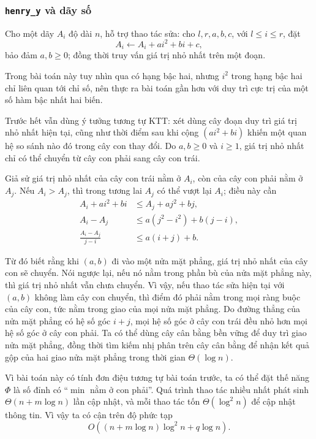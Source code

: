 \documentclass[11pt]{article}
\begin{document}
\subsubsection{\texttt{henry\_y} và dãy số}

 Cho một dãy \(A_i\) độ dài \(n\), hỗ trợ thao tác sửa:
cho \(l,r,a,b,c\), với \(l\le i\le r\), đặt
\[
  A_i\gets A_i+ai^2+bi+c,
\]
bảo đảm \(a,b\ge 0\); đồng thời truy vấn giá trị nhỏ nhất trên một đoạn.

 Trong bài toán này tuy nhìn qua có hạng bậc hai, nhưng
\(i^2\) trong hạng bậc hai chỉ liên quan tới chỉ số, nên thực ra bài toán gần
hơn với duy trì cực trị của một số hàm bậc nhất hai biến.

Trước hết vẫn dùng ý tưởng tương tự KTT: xét dùng cây đoạn duy trì giá trị nhỏ
nhất hiện tại, cũng như thời điểm sau khi cộng \((ai^2+bi)\) khiến một quan hệ
so sánh nào đó trong cây con thay đổi. Do \(a,b\ge 0\) và \(i\ge 1\), giá trị
nhỏ nhất chỉ có thể chuyển từ cây con phải sang cây con trái.

Giả sử giá trị nhỏ nhất của cây con trái nằm ở \(A_i\), còn của cây con phải
nằm ở \(A_j\). Nếu \(A_i>A_j\), thì trong tương lai \(A_j\) có thể vượt lại
\(A_i\); điều này cần
\[
\begin{aligned}
A_i+ai^2+bi &\le A_j+aj^2+bj,\\
A_i-A_j &\le a(j^2-i^2)+b(j-i),\\
\frac{A_i-A_j}{j-i} &\le a(i+j)+b.
\end{aligned}
\]

Từ đó biết rằng khi \((a,b)\) đi vào một nửa mặt phẳng, giá trị nhỏ nhất của cây
con sẽ chuyển. Nói ngược lại, nếu nó nằm trong phần bù của nửa mặt phẳng này,
thì giá trị nhỏ nhất vẫn chưa chuyển. Vì vậy, nếu thao tác sửa hiện tại với
\((a,b)\) không làm cây con chuyển, thì điểm đó phải nằm trong mọi ràng buộc của
cây con, tức nằm trong giao của mọi nửa mặt phẳng. Do đường thẳng của nửa mặt
phẳng có hệ số góc \(i+j\), mọi hệ số góc ở cây con trái đều nhỏ hơn mọi hệ số
góc ở cây con phải. Ta có thể dùng cây cân bằng bền vững để duy trì giao nửa mặt
phẳng, đồng thời tìm kiếm nhị phân trên cây cân bằng để nhận kết quả gộp của
hai giao nửa mặt phẳng trong thời gian \(\Theta(\log n)\).

Vì bài toán này có tính đơn điệu tương tự bài toán trước, ta có thể đặt thế
năng \(\Phi\) là số đỉnh có ``\(\min\) nằm ở con phải''. Quá trình thao tác
nhiều nhất phát sinh \(\Theta(n+m\log n)\) lần cập nhật, và mỗi thao tác tốn
\(\Theta(\log^2 n)\) để cập nhật thông tin. Vì vậy ta có cận trên độ phức tạp
\[
  O((n+m\log n)\log^2 n+q\log n).
\]
\end{document}
